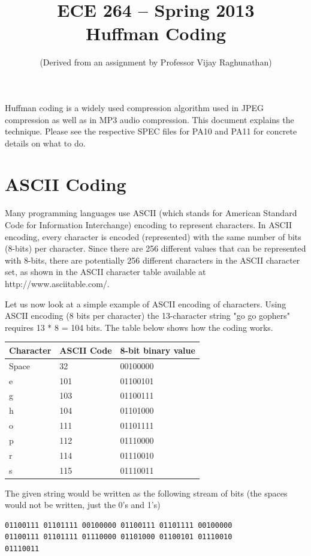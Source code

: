 \documentclass[11pt]{article}
\title{ECE 264 -- Spring 2013\\ Huffman Coding}
\author{(Derived from an assignment by Professor Vijay Raghunathan)}
\date{}
\begin{document}
\maketitle

Huffman coding is a widely used compression algorithm used in JPEG
compression as well as in MP3 audio compression.  This document
explains the technique.  Please see the respective SPEC files for PA10
and PA11 for concrete details on what to do.

\section{ASCII Coding}

Many programming languages use ASCII (which stands for American
Standard Code for Information Interchange) encoding to represent
characters.  In ASCII encoding, every character is encoded
(represented) with the same number of bits (8-bits) per character.
Since there are 256 different values that can be represented with
8-bits, there are potentially 256 different characters in the ASCII
character set, as shown in the ASCII character table available at
http://www.asciitable.com/.
 
Let us now look at a simple example of ASCII encoding of characters.
Using ASCII encoding (8 bits per character) the 13-character string
"go go gophers" requires 13 * 8 = 104 bits.  The table below shows how
the coding works.

\begin{tabular}{lll}
  \hline
  \textbf{Character} & \textbf{ASCII Code} & \textbf{8-bit binary value}\\
  \hline
  Space	& 32 & 00100000\\
  e & 101 & 01100101\\
  g & 103 & 01100111\\
  h & 104 & 01101000\\
  o & 111 & 01101111\\
  p & 112 & 01110000\\
  r & 114 & 01110010\\
  s & 115 & 01110011\\
  \hline
\end{tabular}

The given string would be written as the following stream of bits (the
spaces would not be written, just the 0's and 1's)

\begin{verbatim} 
01100111 01101111 00100000 01100111 01101111 00100000
01100111 01101111 01110000 01101000 01100101 01110010
01110011
\end{verbatim}
\end{document}
